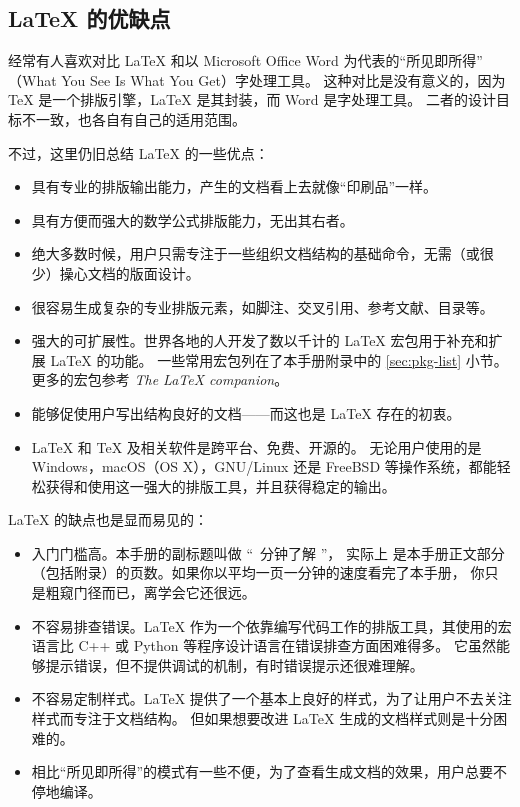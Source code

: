 \subsection{\LaTeX{} 的优缺点}\label{subec:advs}

经常有人喜欢对比 \LaTeX{} 和以 Microsoft Office Word 为代表的“所见即所得”%
（What You See Is What You Get）字处理工具。
这种对比是没有意义的，因为 \TeX{} 是一个排版引擎，\LaTeX{} 是其封装，而 Word 是字处理工具。
二者的设计目标不一致，也各自有自己的适用范围。

不过，这里仍旧总结 \LaTeX{} 的一些优点：
\begin{itemize}
  \item 具有专业的排版输出能力，产生的文档看上去就像“印刷品”一样。
  \item 具有方便而强大的数学公式排版能力，无出其右者。
  \item 绝大多数时候，用户只需专注于一些组织文档结构的基础命令，无需（或很少）操心文档的版面设计。
  \item 很容易生成复杂的专业排版元素，如脚注、交叉引用、参考文献、目录等。
  \item 强大的可扩展性。世界各地的人开发了数以千计的 \LaTeX{} 宏包用于补充和扩展 \LaTeX{} 的功能。
  一些常用宏包列在了本手册附录中的 \ref{sec:pkg-list} 小节。更多的宏包参考 \textit{The \LaTeX{} companion}\cite{companion}。
  \item 能够促使用户写出结构良好的文档——而这也是 \LaTeX{} 存在的初衷。
  \item \LaTeX{} 和 \TeX{} 及相关软件是跨平台、免费、开源的。
  无论用户使用的是 Windows，macOS（OS X），GNU/Linux 还是 FreeBSD 等操作系统，都能轻松获得和使用这一强大的排版工具，并且获得稳定的输出。
\end{itemize}

\LaTeX{} 的缺点也是显而易见的：
\begin{itemize}
  \item 入门门槛高。本手册的副标题叫做 “\pageref{lshort-minutes}~分钟了解 \LaTeXe ”，
  实际上 \pageref{lshort-minutes} 是本手册正文部分（包括附录）的页数。如果你以平均一页一分钟的速度看完了本手册，
  你只是粗窥门径而已，离学会它还很远。
  \item 不容易排查错误。\LaTeX{} 作为一个依靠编写代码工作的排版工具，其使用的宏语言比 C++ 或 Python 等程序设计语言在错误排查方面困难得多。
  它虽然能够提示错误，但不提供调试的机制，有时错误提示还很难理解。
  \item 不容易定制样式。\LaTeX{} 提供了一个基本上良好的样式，为了让用户不去关注样式而专注于文档结构。
  但如果想要改进 \LaTeX{} 生成的文档样式则是十分困难的。
  \item 相比“所见即所得”的模式有一些不便，为了查看生成文档的效果，用户总要不停地编译。
\end{itemize}

